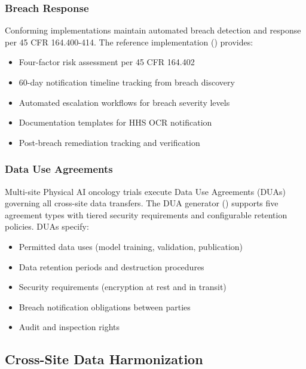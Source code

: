 \documentclass[11pt,letterpaper]{article}
\begin{document}
\subsubsection{Breach Response}

Conforming implementations \SHALL{} maintain automated breach detection and response per 45 CFR 164.400-414. The reference implementation () provides:

\begin{itemize}
  \item Four-factor risk assessment per 45 CFR 164.402
  \item 60-day notification timeline tracking from breach discovery
  \item Automated escalation workflows for breach severity levels
  \item Documentation templates for HHS OCR notification
  \item Post-breach remediation tracking and verification
\end{itemize}

\subsubsection{Data Use Agreements}

Multi-site Physical AI oncology trials \SHALL{} execute Data Use Agreements (DUAs) governing all cross-site data transfers. The DUA generator () supports five agreement types with tiered security requirements and configurable retention policies. DUAs \SHALL{} specify:

\begin{itemize}
  \item Permitted data uses (model training, validation, publication)
  \item Data retention periods and destruction procedures
  \item Security requirements (encryption at rest and in transit)
  \item Breach notification obligations between parties
  \item Audit and inspection rights
\end{itemize}

\subsection{Cross-Site Data Harmonization}
\end{document}
